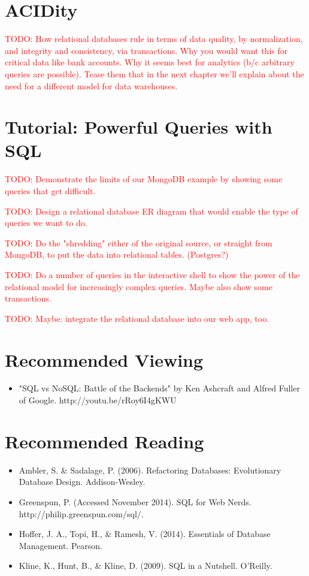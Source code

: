 \documentclass[11pt]{book}
\newcommand{\todo}[1]{\textcolor{red}{TODO: #1}} %
\begin{document}
\section{ACIDity}
\todo{How relational databases rule in terms of data quality, by normalization, and integrity and consistency, via transactions.  Why you would want this for critical data like bank accounts.  Why it seems best for analytics (b/c arbitrary queries are possible).  Tease them that in the next chapter we'll explain about the need for a different model for data warehouses.}

\section{Tutorial: Powerful Queries with SQL}

\todo{Demonstrate the limits of our MongoDB example by showing some queries that get difficult.}

\todo{Design a relational database ER diagram that would enable the type of queries we want to do.}

\todo{Do the "shredding" either of the original source, or straight from MongoDB, to put the data into relational tables. (Postgres?)}

\todo{Do a number of queries in the interactive shell to show the power of the relational model for increasingly complex queries.  Maybe also show some transactions.}

\todo{Maybe: integrate the relational database into our web app, too.}

\section*{Recommended Viewing}
\begin{itemize}
    \item "SQL vs NoSQL: Battle of the Backends" by Ken Ashcraft and Alfred Fuller of Google.  http://youtu.be/rRoy6I4gKWU
\end{itemize}

\section*{Recommended Reading}
\begin{itemize}
    \item Ambler, S. \& Sadalage, P. (2006). Refactoring Databases: Evolutionary Database Design.  Addison-Wesley.
    \item Greenspun, P.  (Accessed November 2014). SQL for Web Nerds.\\ http://philip.greenspun.com/sql/.
    \item Hoffer, J. A., Topi, H., \& Ramesh, V. (2014). Essentials of Database Management.  Pearson.
    \item Kline, K., Hunt, B., \& Kline, D. (2009).  SQL in a Nutshell.  O'Reilly.
\end{itemize}
\end{document}
